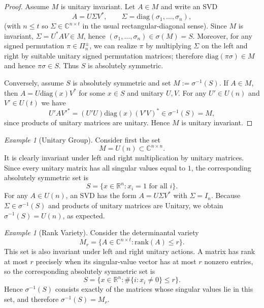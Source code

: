 \documentclass[11pt]{amsart}
\theoremstyle{plain}
\theoremstyle{definition}
\theoremstyle{remark}
\newtheorem{example}[theorem]{Example}
\begin{document}
\begin{proof}
Assume $M$ is unitary invariant. Let $A\in M$ and write an SVD
\[
A=U\Sigma V^*,
\qquad
\Sigma=\mathrm{diag}(\sigma_1,\ldots,\sigma_n),
\]
(with $n\le t$ so $\Sigma\in \mathbb{C}^{n\times t}$ in the usual rectangular-diagonal sense).
Since $M$ is invariant, $\Sigma=U^*AV\in M$, hence $(\sigma_1,\ldots,\sigma_n)\in \sigma(M)=S$.
Moreover, for any signed permutation $\pi\in \Pi_n^\pm$, we can realize $\pi$ by multiplying
$\Sigma$ on the left and right by suitable unitary signed permutation matrices; therefore
$\mathrm{diag}(\pi\sigma)\in M$ and hence $\pi\sigma\in S$. Thus $S$ is absolutely symmetric.

Conversely, assume $S$ is absolutely symmetric and set $M:=\sigma^{-1}(S)$.
If $A\in M$, then $A=U\mathrm{diag}(x)V^*$ for some $x\in S$ and unitary $U,V$.
For any $U'\in U(n)$ and $V'\in U(t)$ we have
\[
U'AV'^*=(U'U)\mathrm{diag}(x)(V'V)^*\in \sigma^{-1}(S)=M,
\]
since products of unitary matrices are unitary. Hence $M$ is unitary invariant.
\end{proof}

    \begin{example}[Unitary Group]
Consider first the set 
\[
M = U(n) \subset \mathbb{C}^{n\times n}.
\]
It is clearly invariant under left and right multiplication by unitary matrices.  
Since every unitary matrix has all singular values equal to \(1\), the corresponding absolutely
symmetric set is
\[
S = \{ x \in \mathbb{R}^n : x_i = 1 \text{ for all } i \}.
\]
For any \(A \in U(n)\), an SVD has the form \(A = U \Sigma V^*\) with \(\Sigma = I_n\).
Because \(\Sigma \in \sigma^{-1}(S)\) and products of unitary matrices are Unitary, we obtain
\(\sigma^{-1}(S) = U(n)\), as expected.
\end{example}

\begin{example}[Rank Variety]
Consider the determinantal variety
\[
M_r = \{ A \in \mathbb{C}^{n\times t} : \mathrm{rank}(A) \le r \}.
\]
This set is also invariant under left and right unitary actions.
A matrix has rank at most \(r\) precisely when its singular-value vector has at most \(r\) nonzero
entries, so the corresponding absolutely symmetric set is
\[
S = \{ x \in \mathbb{R}^n : \#\{i : x_i \neq 0\} \le r \}.
\]
Hence \(\sigma^{-1}(S)\) consists exactly of the matrices whose singular values lie in this set,
and therefore \(\sigma^{-1}(S) = M_r\).
\end{example}
\end{document}
